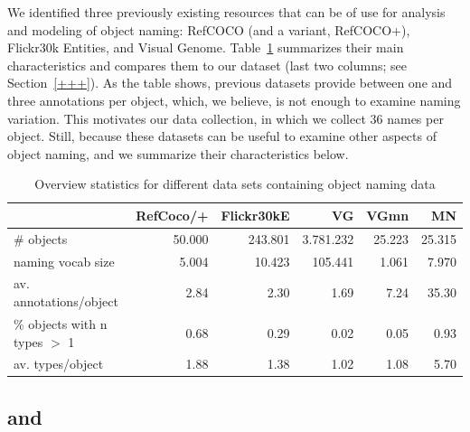 We identified three previously existing resources that can be of use for analysis and modeling of object naming: RefCOCO (and a variant, RefCOCO+), Flickr30k Entities, and Visual Genome. Table~\ref{tab:compare} summarizes their main characteristics and compares them to our dataset (last two columns; see Section~\ref{+++}). 
As the table shows, previous datasets provide between one and three annotations per object, which, we believe, is not enough to examine naming variation.
This motivates our data collection, in which we collect 36 names per object.
Still, because these datasets can be useful to examine other aspects of object naming, and we summarize their characteristics below.

\begin{table}
\centering
\begin{tabular}{lrrrrr}
\toprule
  &   RefCoco/+  &  Flickr30kE &           VG &      VGmn &        MN \\
\midrule
                  \# objects & 50.000 & 243.801 & 3.781.232 & 25.223 & 25.315 \\
                naming vocab size &  5.004 &  10.423 &   105.441 &  1.061 &  7.970 \\
     av. annotations/object &      2.84 &       2.30 &         1.69 &      7.24 &     35.30 \\
 \% objects with n types $>$ 1 &      0.68 &       0.29 &         0.02 &      0.05 &      0.93 \\
           av. types/object &      1.88 &       1.38 &         1.02 &      1.08 &      5.70 \\
\bottomrule
\end{tabular}
\label{tab:compare}
\caption{Overview statistics for different data sets containing object naming data  }
\end{table}


\subsection{ and }

